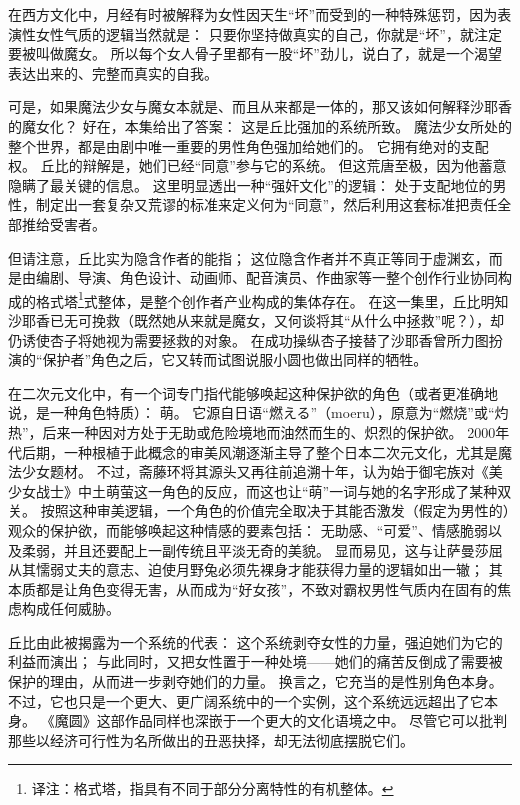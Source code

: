 在西方文化中，月经有时被解释为女性因天生“坏”而受到的一种特殊惩罚\cite{ref59}，因为表演性女性气质的逻辑当然就是：
只要你坚持做真实的自己，你就是“坏”，就注定要被叫做魔女。
所以每个女人骨子里都有一股“坏”劲儿，说白了，就是一个渴望表达出来的、完整而真实的自我。

可是，如果魔法少女与魔女本就是、而且从来都是一体的，那又该如何解释沙耶香的魔女化？
好在，本集给出了答案：
这是丘比强加的系统所致。
魔法少女所处的整个世界，都是由剧中唯一重要的男性角色强加给她们的。
它拥有绝对的支配权。
丘比的辩解是，她们已经“同意”参与它的系统。
但这荒唐至极，因为他蓄意隐瞒了最关键的信息。
这里明显透出一种“强奸文化”的逻辑：
处于支配地位的男性，制定出一套复杂又荒谬的标准来定义何为“同意”，然后利用这套标准把责任全部推给受害者。

但请注意，丘比实为隐含作者的能指；
这位隐含作者并不真正等同于虚渊玄，而是由编剧、导演、角色设计、动画师、配音演员、作曲家等一整个创作行业协同构成的格式塔\footnote{%
    译注：格式塔，指具有不同于部分分离特性的有机整体。
}式整体，是整个创作者产业构成的集体存在。
在这一集里，丘比明知沙耶香已无可挽救（既然她从来就是魔女，又何谈将其“从什么中拯救”呢？），却仍诱使杏子将她视为需要拯救的对象。
在成功操纵杏子接替了沙耶香曾所力图扮演的“保护者”角色之后，它又转而试图说服小圆也做出同样的牺牲。

在二次元文化中，有一个词专门指代能够唤起这种保护欲的角色（或者更准确地说，是一种角色特质）：
萌。
它源自日语“燃える”（moeru），原意为“燃烧”或“灼热”，后来一种因对方处于无助或危险境地而油然而生的、炽烈的保护欲。
2000年代后期，一种根植于此概念的审美风潮逐渐主导了整个日本二次元文化，尤其是魔法少女题材。
不过，斋藤环将其源头又再往前追溯十年，认为始于御宅族对《美少女战士》中土萌萤这一角色的反应，而这也让“萌”一词与她的名字形成了某种双关。
按照这种审美逻辑，一个角色的价值完全取决于其能否激发（假定为男性的）观众的保护欲，而能够唤起这种情感的要素包括：
无助感、“可爱”、情感脆弱以及柔弱，并且还要配上一副传统且平淡无奇的美貌\cite{ref60}。
显而易见，这与让萨曼莎屈从其懦弱丈夫的意志、迫使月野兔必须先裸身才能获得力量的逻辑如出一辙；
其本质都是让角色变得无害，从而成为“好女孩”，不致对霸权男性气质内在固有的焦虑构成任何威胁。

丘比由此被揭露为一个系统的代表：
这个系统剥夺女性的力量，强迫她们为它的利益而演出；
与此同时，又把女性置于一种处境——她们的痛苦反倒成了需要被保护的理由，从而进一步剥夺她们的力量。
换言之，它充当的是性别角色本身。
不过，它也只是一个更大、更广阔系统中的一个实例，这个系统远远超出了它本身。
《魔圆》这部作品同样也深嵌于一个更大的文化语境之中。
尽管它可以批判那些以经济可行性为名所做出的丑恶抉择，却无法彻底摆脱它们。

